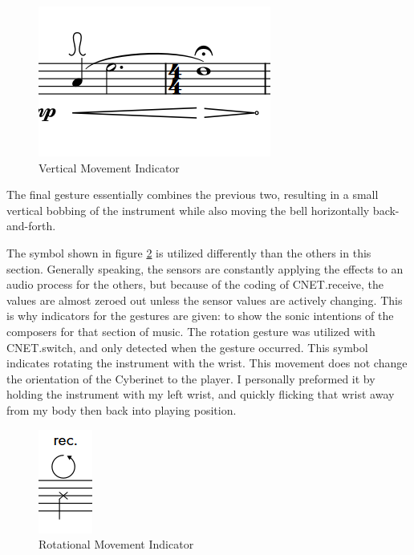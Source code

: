 \begin{figure}
    \centering
    \includegraphics{Scores/wave.png}
    \caption{Vertical Movement Indicator}
    \label{fig:vertMovement}
\end{figure}

The final gesture essentially combines the previous two, resulting in a small vertical bobbing of the instrument while also moving the bell horizontally back-and-forth.


The symbol shown in figure \ref{fig:rotateMovement} is utilized differently than the others in this section. Generally speaking, the sensors are constantly applying the effects to an audio process for the others, but because of the coding of CNET.receive, the values are almost zeroed out unless the sensor values are actively changing. This is why indicators for the gestures are given: to show the sonic intentions of the composers for that section of music. The rotation gesture was utilized with CNET.switch, and only detected when the gesture occurred. This symbol indicates rotating the instrument with the wrist. This movement does not change the orientation of the Cyberinet to the player. I personally preformed it by holding the instrument with my left wrist, and quickly flicking that wrist away from my body then back into playing position.

\begin{figure}
    \centering
    \includegraphics[scale=1.3]{Scores/trigger.png}
    \caption{Rotational Movement Indicator}
    \label{fig:rotateMovement}
\end{figure}




